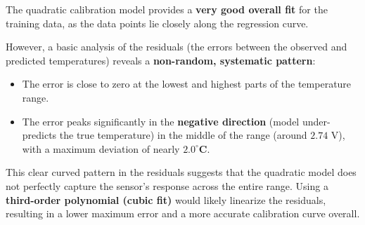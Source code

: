 \documentclass{article}
\begin{document}
The quadratic calibration model provides a \textbf{very good overall fit} for the training data, as the data points lie closely along the regression curve.

However, a basic analysis of the residuals (the errors between the observed and predicted temperatures) reveals a \textbf{non-random, systematic pattern}:

\begin{itemize}
    \item The error is close to zero at the lowest and highest parts of the temperature range.
    \item The error peaks significantly in the \textbf{negative direction} (model under-predicts the true temperature) in the middle of the range (around $2.74\text{ V}$), with a maximum deviation of nearly $\mathbf{2.0^\circ\text{C}}$.
\end{itemize}

This clear curved pattern in the residuals suggests that the quadratic model does not perfectly capture the sensor's response across the entire range. Using a \textbf{third-order polynomial (cubic fit)} would likely linearize the residuals, resulting in a lower maximum error and a more accurate calibration curve overall.
\end{document}
